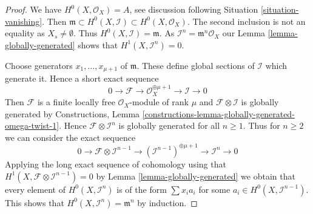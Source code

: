 \documentclass[10pt,a4paper]{amsart}
\theoremstyle{plain}
\theoremstyle{definition}
\theoremstyle{remark}
\numberwithin{equation}{subsection}
\begin{document}
\begin{proof}
We have $H^0(X, \mathcal{O}_X) = A$, see discussion following
Situation \ref{situation-vanishing}. Then
$\mathfrak m \subset H^0(X, \mathcal{I}) \subset H^0(X, \mathcal{O}_X)$.
The second inclusion is not an equality as $X_s \not = \emptyset$.
Thus $H^0(X, \mathcal{I}) = \mathfrak m$.
As $\mathcal{I}^n = \mathfrak m^n\mathcal{O}_X$ our
Lemma \ref{lemma-globally-generated} shows that $H^1(X, \mathcal{I}^n) = 0$.

\medskip\noindent
Choose generators $x_1, \ldots, x_{\mu + 1}$ of $\mathfrak m$. These define
global sections of $\mathcal{I}$ which generate it. Hence
a short exact sequence
$$
0 \to \mathcal{F} \to \mathcal{O}_X^{\oplus \mu + 1} \to \mathcal{I} \to 0
$$
Then $\mathcal{F}$ is a finite locally free $\mathcal{O}_X$-module
of rank $\mu$ and $\mathcal{F} \otimes \mathcal{I}$ is globally
generated by Constructions, Lemma
\ref{constructions-lemma-globally-generated-omega-twist-1}.
Hence $\mathcal{F} \otimes \mathcal{I}^n$
is globally generated for all $n \geq 1$. Thus for $n \geq 2$ we can
consider the exact sequence
$$
0 \to \mathcal{F} \otimes \mathcal{I}^{n - 1} \to
(\mathcal{I}^{n - 1})^{\oplus \mu + 1} \to
\mathcal{I}^n \to 0
$$
Applying the long exact sequence of cohomology using that
$H^1(X, \mathcal{F} \otimes \mathcal{I}^{n - 1}) = 0$ by
Lemma \ref{lemma-globally-generated}
we obtain that every
element of $H^0(X, \mathcal{I}^n)$ is of the form $\sum x_i a_i$
for some $a_i \in H^0(X, \mathcal{I}^{n - 1})$. This shows that
$H^0(X, \mathcal{I}^n) = \mathfrak m^n$ by induction.
\end{proof}
\end{document}
